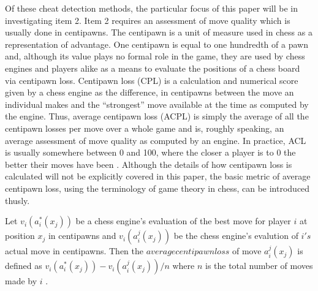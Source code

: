 \documentclass[12pt, letterpaper, titlepage]{article}
\begin{document}
Of these cheat detection methods, the particular focus of this paper will be in investigating item 2. Item 2 requires an assessment of move quality which is usually done in centipawns. The centipawn is a unit of measure used in chess as a representation of advantage. One centipawn is equal to one hundredth of a pawn and, although its value plays no formal role in the game, they are used by chess engines and players alike as a means to evaluate the positions of a chess board via centipawn loss. Centipawn loss (CPL) is a calculation and numerical score given by a chess engine as the difference, in centipawns between the move an individual makes and the “strongest” move available at the time as computed by the engine. Thus, average centipawn loss (ACPL) is simply the average of all the centipawn losses per move over a whole game and is, roughly speaking, an average assessment of move quality as computed by an engine. In practice, ACL is usually somewhere between 0 and 100, where the closer a player is to 0 the better their moves have been \citep{avva2022guess}. Although the details of how centipawn loss is calculated will not be explicitly covered in this paper, the basic metric of average centipawn loss, using the terminology of game theory in chess, can be introduced thusly.

Let \begin{math}v_{i}(a_{i}^*(x_{j}))\end{math} be a chess engine's evaluation of the best move for player \begin{math}i\end{math} at position \begin{math}x_{j}\end{math} in centipawns and \begin{math}v_{i}(a_{i}^j(x_{j}))\end{math} be the chess engine's evalution of \begin{math}i's\end{math} actual move in centipawns. Then the \begin{math}average centipawn loss\end{math} of move \begin{math}a_{i}^j(x_{j})\end{math} is defined as \begin{math}v_{i}(a_{i}^*(x_{j})) - v_{i}(a_{i}^j(x_{j}))/n\end{math} where \begin{math}n\end{math} is the total number of moves made by \begin{math}i\end{math} \citep{anbarciai}.
\end{document}
